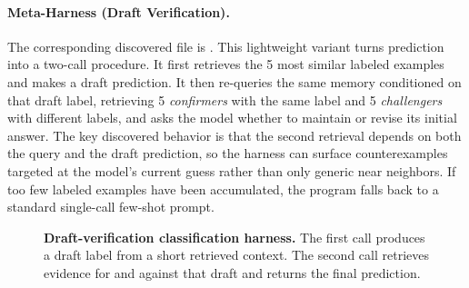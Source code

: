 \paragraph{Meta-Harness (Draft Verification).}
The corresponding discovered file is .
This lightweight variant turns prediction into a two-call procedure.
It first retrieves the 5 most similar labeled examples and makes a draft prediction.
It then re-queries the same memory conditioned on that draft label, retrieving 5 \emph{confirmers} with the same label and 5 \emph{challengers} with different labels, and asks the model whether to maintain or revise its initial answer.
The key discovered behavior is that the second retrieval depends on both the query and the draft prediction, so the harness can surface counterexamples targeted at the model's current guess rather than only generic near neighbors.
If too few labeled examples have been accumulated, the program falls back to a standard single-call few-shot prompt.

\begin{figure}[t]
\centering
{}
\caption{\textbf{Draft-verification classification harness.}
The first call produces a draft label from a short retrieved context.
The second call retrieves evidence for and against that draft and returns the final prediction.}
\label{fig:classification-draft-verify}
\end{figure}

